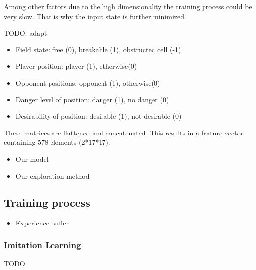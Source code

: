 Among other factors due to the high dimensionality the training process could be very slow. That is why the input state is further minimized.

TODO: adapt
\begin{itemize}
	\item Field state: free (0), breakable (1), obstructed cell (-1)
	\item Player position: player (1), otherwise(0)
	\item Opponent positions: opponent (1), otherwise(0)
	\item Danger level of position: danger (1), no danger (0)
	\item Desirability of position: desirable (1), not desirable (0)
\end{itemize}
These matrices are flattened and concatenated. This results in a feature vector containing 578 elements (2*17*17).



\begin{itemize}
	\item Our model
	\item Our exploration method
\end{itemize}

\subsection{Training process} 
\label{ch:approachB}



\begin{itemize}
	\item Experience buffer
\end{itemize}

\subsubsection{Imitation Learning}
\label{ch:approachBx}
TODO